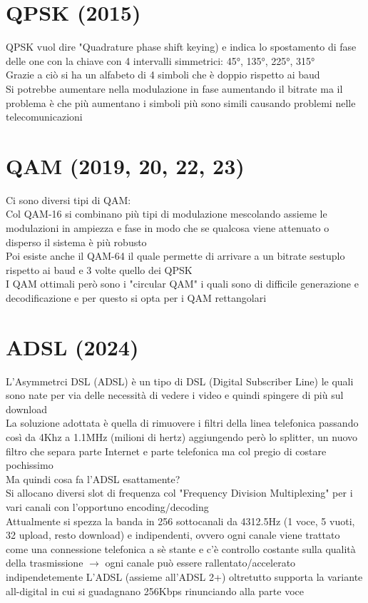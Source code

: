 \documentclass[12pt,oneside,a4paper]{article}
\begin{document}
\section{QPSK (2015)}
QPSK vuol dire "Quadrature phase shift keying) e indica lo spostamento di fase delle one con la chiave con 4 intervalli simmetrici: 45°, 135°, 225°, 315°\\
Grazie a ciò si ha un alfabeto di 4 simboli che è doppio rispetto ai baud\\
Si potrebbe aumentare nella modulazione in fase aumentando il bitrate ma il problema è che più aumentano i simboli più sono simili causando problemi nelle telecomunicazioni\\
\section{QAM (2019, 20, 22, 23)}
Ci sono diversi tipi di QAM:\\
Col QAM-16 si combinano più tipi di modulazione mescolando assieme le modulazioni in ampiezza e fase in modo che se qualcosa viene attenuato o disperso il sistema è più robusto\\
Poi esiste anche il QAM-64 il quale permette di arrivare a un bitrate sestuplo rispetto ai baud e 3 volte quello dei QPSK\\
I QAM ottimali però sono i "circular QAM" i quali sono di difficile generazione e decodificazione e per questo si opta per i 	QAM rettangolari
\section{ADSL (2024)}
L'Asymmetrci DSL (ADSL) è un tipo di DSL (Digital Subscriber Line) le quali sono nate per via delle necessità di vedere i video e quindi spingere di più sul download\\
La soluzione adottata è quella di rimuovere i filtri della linea telefonica passando così da 4Khz a 1.1MHz (milioni di hertz) aggiungendo però lo splitter, un nuovo filtro che separa parte Internet e parte telefonica ma col pregio di costare pochissimo\\
Ma quindi cosa fa l'ADSL esattamente?\\
Si allocano diversi slot di frequenza col "Frequency Division Multiplexing" per i vari canali con l'opportuno encoding/decoding\\
Attualmente si spezza la banda in 256 sottocanali da 4312.5Hz (1 voce, 5 vuoti, 32 upload, resto download) e indipendenti, ovvero ogni canale viene trattato come una connessione telefonica a sè stante e c'è controllo costante sulla qualità della trasmissione $\to$ ogni canale può essere rallentato/accelerato indipendetemente
L'ADSL (assieme all'ADSL 2+) oltretutto supporta la variante all-digital in cui si guadagnano 256Kbps rinunciando alla parte voce
\end{document}
